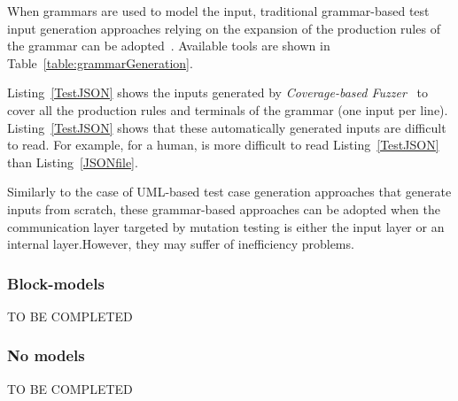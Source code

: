 When grammars are used to model the input, traditional grammar-based test input generation approaches relying on the expansion of the production rules of the grammar can be adopted~\cite{fuzzingbook2019:GrammarFuzzer}. 
Available tools are shown in Table~\ref{table:grammarGeneration}.

Listing~\ref{TestJSON} shows the inputs generated by \emph{Coverage-based Fuzzer}~\cite{fuzzingbook2019:GrammarFuzzer} to cover all the production rules and terminals of the grammar (one input per line). Listing~\ref{TestJSON} shows that these automatically generated inputs are difficult to read. For example, for a human, is more difficult to  read Listing~\ref{TestJSON}  than Listing~\ref{JSONfile}.





Similarly to the case of UML-based test case generation approaches that generate inputs from scratch, these grammar-based approaches can be adopted when the communication layer targeted by mutation testing is either the input layer or an internal layer.However, they may suffer of inefficiency problems.


\subsubsection{Block-models}

TO BE COMPLETED


\subsubsection{No models}


TO BE COMPLETED

\endinput

